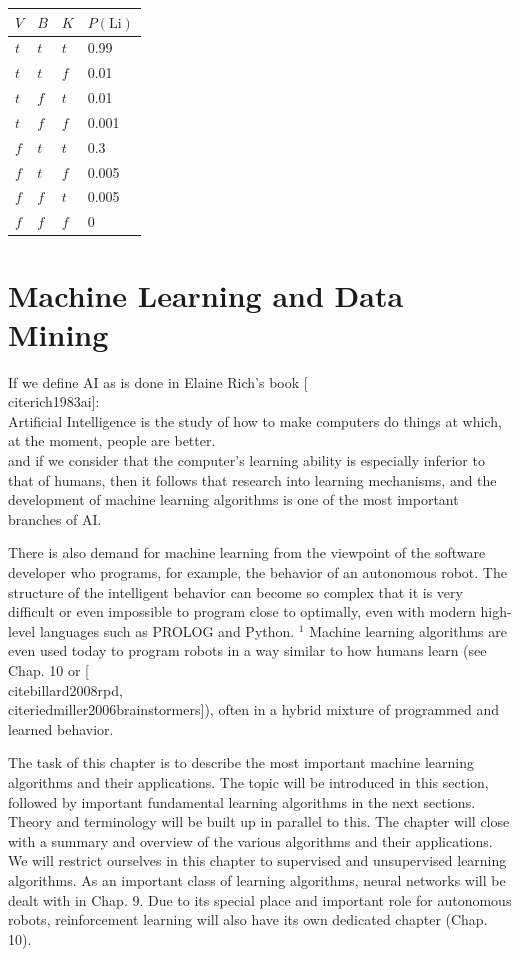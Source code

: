 \documentclass[10pt]{book}
\begin{document}
\begin{center}
\begin{tabular}{llll}
\hline
$V$ & $B$ & $K$ & $P(\mathrm{Li})$ \\
\hline
$t$ & $t$ & $t$ & 0.99 \\
\hline
$t$ & $t$ & $f$ & 0.01 \\
\hline
$t$ & $f$ & $t$ & 0.01 \\
\hline
$t$ & $f$ & $f$ & 0.001 \\
\hline
$f$ & $t$ & $t$ & 0.3 \\
\hline
$f$ & $t$ & $f$ & 0.005 \\
\hline
$f$ & $f$ & $t$ & 0.005 \\
\hline
$f$ & $f$ & $f$ & 0 \\
\hline
\end{tabular}
\end{center}

\section*{Machine Learning and Data Mining}
If we define AI as is done in Elaine Rich's book [\\cite{rich1983ai}]:\\
Artificial Intelligence is the study of how to make computers do things at which, at the moment, people are better.\\
and if we consider that the computer's learning ability is especially inferior to that of humans, then it follows that research into learning mechanisms, and the development of machine learning algorithms is one of the most important branches of AI.

There is also demand for machine learning from the viewpoint of the software developer who programs, for example, the behavior of an autonomous robot. The structure of the intelligent behavior can become so complex that it is very difficult or even impossible to program close to optimally, even with modern high-level languages such as PROLOG and Python. ${ }^{1}$ Machine learning algorithms are even used today to program robots in a way similar to how humans learn (see Chap. 10 or [\\cite{billard2008rpd}, \\cite{riedmiller2006brainstormers}]), often in a hybrid mixture of programmed and learned behavior.

The task of this chapter is to describe the most important machine learning algorithms and their applications. The topic will be introduced in this section, followed by important fundamental learning algorithms in the next sections. Theory and terminology will be built up in parallel to this. The chapter will close with a summary and overview of the various algorithms and their applications. We will restrict ourselves in this chapter to supervised and unsupervised learning algorithms. As an important class of learning algorithms, neural networks will be dealt with in Chap. 9. Due to its special place and important role for autonomous robots, reinforcement learning will also have its own dedicated chapter (Chap. 10).
\end{document}
